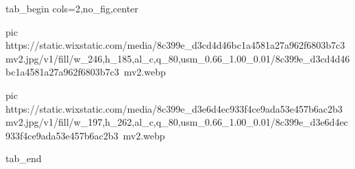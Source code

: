  
 
 
 
 

\ifcmt
  tab_begin cols=2,no_fig,center

     pic https://static.wixstatic.com/media/8c399e_d3cd4d46bc1a4581a27a962f6803b7c3~mv2.jpg/v1/fill/w_246,h_185,al_c,q_80,usm_0.66_1.00_0.01/8c399e_d3cd4d46bc1a4581a27a962f6803b7c3~mv2.webp

		 pic https://static.wixstatic.com/media/8c399e_d3e6d4ec933f4ce9ada53e457b6ac2b3~mv2.jpg/v1/fill/w_197,h_262,al_c,q_80,usm_0.66_1.00_0.01/8c399e_d3e6d4ec933f4ce9ada53e457b6ac2b3~mv2.webp

  tab_end
\fi
